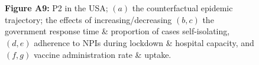 \documentclass[paper=a4,fontsize=11pt]{article}
\begin{document}
\begin{figure}[!h]
  \\
  \hspace{1.76cm}
  \\
  \caption*{\textbf{Figure A9:} P2 in the USA; $(a)$ the counterfactual epidemic trajectory; the effects of increasing/decreasing $(b,c)$ the government response time \& proportion of cases self-isolating, $(d,e)$ adherence to NPIs during lockdown \& hospital capacity, and $(f,g)$ vaccine administration rate \& uptake.}
\end{figure}
\end{document}
